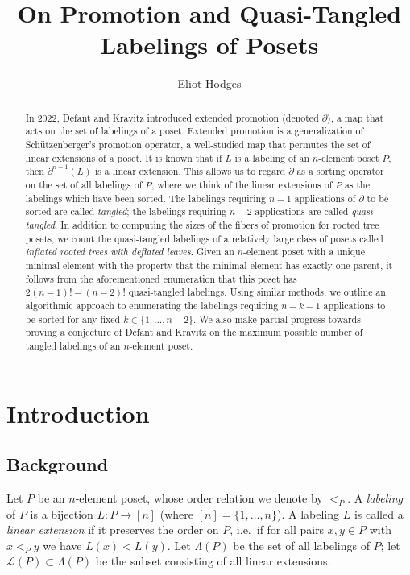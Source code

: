 \documentclass[11pt]{amsart}
\theoremstyle{definition}
\newcommand{\call}{\mathcal{L}}
\begin{document}
\title{On Promotion and Quasi-Tangled Labelings of Posets}

\author{Eliot Hodges}
\address{Department of Mathematics, Harvard University, Cambridge, MA 02138}
\begin{abstract}
	In 2022, Defant and Kravitz introduced extended promotion (denoted $ \partial $), a map that acts on the set of labelings of a poset. Extended promotion is a generalization of Sch\"{u}tzenberger's promotion operator, a well-studied map that permutes the set of linear extensions of a poset. It is known that if $ L $ is a labeling of an $ n $-element poset $ P $, then $ \partial^{n-1}(L) $ is a linear extension. This allows us to regard $ \partial $ as a sorting operator on the set of all labelings of $ P $, where we think of the linear extensions of $ P $ as the labelings which have been sorted. The labelings requiring $ n-1 $ applications of $ \partial $ to be sorted are called \emph{tangled}; the labelings requiring $ n-2 $ applications are called \emph{quasi-tangled}. In addition to computing the sizes of the fibers of promotion for rooted tree posets, we count the quasi-tangled labelings of a relatively large class of posets called \emph{inflated rooted trees with deflated leaves}. Given an $ n $-element poset with a unique minimal element with the property that the minimal element has exactly one parent, it follows from the aforementioned enumeration that this poset has $ 2(n-1)!-(n-2)! $ quasi-tangled labelings. Using similar methods, we outline an algorithmic approach to enumerating the labelings requiring $ n-k-1 $ applications to be sorted for any fixed $ k\in\{1,\ldots,n-2\} $. We also make partial progress towards proving a conjecture of Defant and Kravitz on the maximum possible number of tangled labelings of an $ n $-element poset.
\end{abstract}
\maketitle
\section{Introduction}
\subsection{Background}
Let $ P $ be an $ n $-element poset, whose order relation we denote by $ <_P $. A \emph{labeling} of $ P $ is a bijection $ L:P\to[n] $ (where $ [n]=\{1,\ldots,n\} $). A labeling $ L $ is called a \emph{linear extension} if it preserves the order on $ P $, i.e.\ if for all pairs $ x,y\in P $ with $ x<_Py $ we have $ L(x)<L(y) $. Let $ \Lambda(P) $ be the set of all labelings of $ P $; let $ \call(P)\subset\Lambda(P) $ be the subset consisting of all linear extensions.
\end{document}
